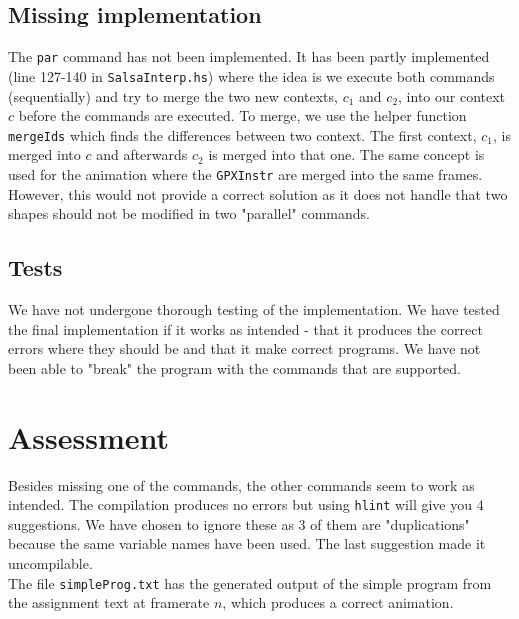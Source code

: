 \documentclass[a4paper]{article}
\begin{document}
\subsection*{Missing implementation}
The \texttt{par} command has not been implemented. It has been partly implemented (line 127-140 in \texttt{SalsaInterp.hs}) where the idea is we execute both commands (sequentially) and try to merge the two new contexts, $c_1$ and $c_2$, into our context $c$ before the commands are executed. To merge, we use the helper function \texttt{mergeIds} which finds the differences between two context. The first context, $c_1$, is merged into $c$ and afterwards $c_2$ is merged into that one. The same concept is used for the animation where the \texttt{GPXInstr} are merged into the same frames. However, this would not provide a correct solution as it does not handle that two shapes should not be modified in two "parallel" commands.

\subsection*{Tests}
We have not undergone thorough testing of the implementation. We have tested the final implementation if it works as intended - that it produces the correct errors where they should be and that it make correct programs. We have not been able to "break" the program with the commands that are supported.

\section*{Assessment}
Besides missing one of the commands, the other commands seem to work as intended. The compilation produces no errors but using \texttt{hlint} will give you $4$ suggestions. We have chosen to ignore these as $3$ of them are "duplications" because the same variable names have been used. The last suggestion made it uncompilable. \\
The file \texttt{simpleProg.txt} has the generated output of the simple program from the assignment text at framerate $n$, which produces a correct animation.
\end{document}
